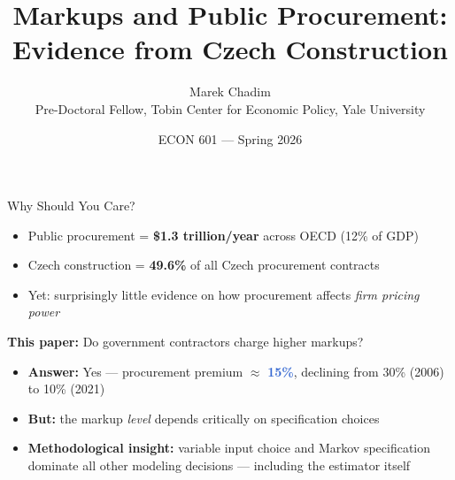\documentclass[aspectratio=169,11pt]{beamer}
\title{\textbf{Markups and Public Procurement:\\Evidence from Czech Construction}}
\author{Marek Chadim\\\small Pre-Doctoral Fellow, Tobin Center for Economic Policy, Yale University}
\date{ECON 601 --- Spring 2026}
\newcommand{\accenttext}[1]{\textcolor{accent}{\textbf{#1}}}
\newcommand{\highlighttext}[1]{\textcolor{highlight}{\textbf{#1}}}
\begin{document}
\begin{frame}[plain]
\maketitle
\end{frame}

\begin{frame}{Why Should You Care?}

\begin{itemize}
    \item Public procurement = \textbf{\$1.3 trillion/year} across OECD (12\% of GDP)
    \item Czech construction = \textbf{49.6\%} of all Czech procurement contracts
    \item Yet: surprisingly little evidence on how procurement affects \emph{firm pricing power}
\end{itemize}

\bigskip

\accenttext{This paper:} Do government contractors charge higher markups?

\bigskip

\begin{itemize}
    \item \textbf{Answer:} Yes --- procurement premium $\approx$ \highlighttext{15\%}, declining from 30\% (2006) to 10\% (2021)
    \item \textbf{But:} the markup \emph{level} depends critically on specification choices
    \item \textbf{Methodological insight:} variable input choice and Markov specification dominate all other modeling decisions --- including the estimator itself
\end{itemize}

\end{frame}
\end{document}
